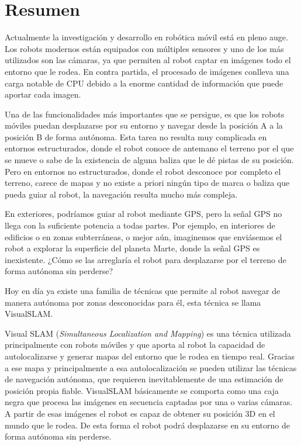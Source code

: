 \chapter*{Resumen}

Actualmente la investigación y desarrollo en robótica móvil está en pleno auge. Los robots modernos están equipados con múltiples sensores y uno de los más utilizados son las cámaras, ya que permiten al robot captar en imágenes todo el entorno que le rodea. En contra partida, el procesado de imágenes conlleva una carga notable de CPU debido a la enorme cantidad de información que puede aportar cada imagen.

Una de las funcionalidades más importantes que se persigue, es que los robots móviles puedan desplazarse por su entorno y navegar desde la posición A a la posición B de forma autónoma. 
Esta tarea no resulta muy complicada en entornos estructurados, donde el robot conoce de antemano el terreno por el que se mueve o sabe de la existencia de alguna baliza que le dé pistas de su posición.
Pero en entornos no estructurados, donde el robot desconoce por completo el terreno, carece de mapas y no existe a priori ningún tipo de marca o baliza que pueda guiar al robot, la navegación resulta mucho más compleja.

En exteriores, podríamos guiar al robot mediante GPS, pero la señal GPS no llega con la suficiente potencia a todas partes. Por ejemplo, en interiores de edificios o en zonas subterráneas, o mejor aún, imaginemos que enviásemos el robot a explorar la superficie del planeta Marte, donde la señal GPS es inexistente. ¿Cómo se las arreglaría el robot para desplazarse por el terreno de forma autónoma sin perderse?

Hoy en día ya existe una familia de técnicas que permite al robot navegar de manera autónoma por zonas desconocidas para él, esta técnica se llama VisualSLAM.


Visual SLAM (\textit{Simultaneous Localization and Mapping}) es una técnica utilizada principalmente con robots móviles y que aporta al robot la capacidad de autolocalizarse y generar mapas del entorno que le rodea en tiempo real. Gracias a ese mapa y principalmente a esa autolocalización se pueden utilizar las técnicas de navegación autónoma, que requieren inevitablemente de una estimación de posición propia fiable. VisualSLAM básicamente se comporta como una caja negra que procesa las imágenes en secuencia captadas por una o varias cámaras. A partir de esas imágenes el robot es capaz de obtener su posición 3D en el mundo que le rodea. De esta forma el robot podrá desplazarse en su entorno de forma autónoma sin perderse.

